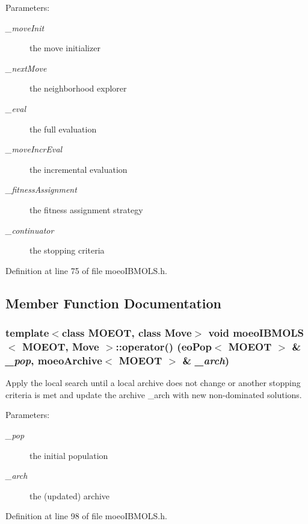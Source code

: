 \begin{Desc}
\item[Parameters:]
\begin{description}
\item[{\em \_\-move\-Init}]the move initializer \item[{\em \_\-next\-Move}]the neighborhood explorer \item[{\em \_\-eval}]the full evaluation \item[{\em \_\-move\-Incr\-Eval}]the incremental evaluation \item[{\em \_\-fitness\-Assignment}]the fitness assignment strategy \item[{\em \_\-continuator}]the stopping criteria \end{description}
\end{Desc}


Definition at line 75 of file moeo\-IBMOLS.h.

\subsection{Member Function Documentation}
\subsubsection{\setlength{\rightskip}{0pt plus 5cm}template$<$class MOEOT, class Move$>$ void \bf{moeo\-IBMOLS}$<$ MOEOT, Move $>$::operator() (eo\-Pop$<$ MOEOT $>$ \& {\em \_\-pop}, \bf{moeo\-Archive}$<$ MOEOT $>$ \& {\em \_\-arch})\hspace{0.3cm}{\tt  [inline]}}\label{classmoeoIBMOLS_fd788bbc4f956dec932dba2a4d4479b6}


Apply the local search until a local archive does not change or another stopping criteria is met and update the archive \_\-arch with new non-dominated solutions. 

\begin{Desc}
\item[Parameters:]
\begin{description}
\item[{\em \_\-pop}]the initial population \item[{\em \_\-arch}]the (updated) archive \end{description}
\end{Desc}


Definition at line 98 of file moeo\-IBMOLS.h.

